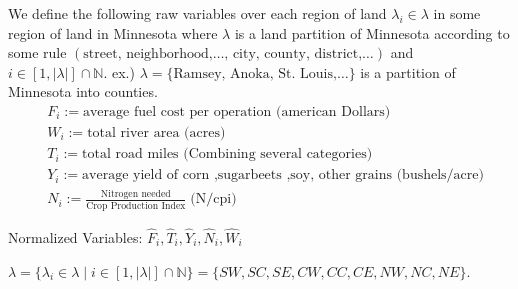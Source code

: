 \documentclass[addpoints,10pt]{exam}
\theoremstyle{plain}
\theoremstyle{definition}
\theoremstyle{plain}
\theoremstyle{plain}
\theoremstyle{definition}
\newcommand{\NN}{\ensuremath{\mathbb{N}}}
\begin{document}
We define the following raw variables over each region of land $\lambda_{i}\in \lambda$ in some region of land in Minnesota where $\lambda$ is a land partition of Minnesota according to some rule $(\text{street, neighborhood,}\hdots\text{, city, county, district,}\hdots)$ and $i\in [1,|\lambda|]\cap \NN$. ex.) $\lambda = \{\text{Ramsey, Anoka, St. Louis,}\hdots\}$ is a partition of Minnesota into counties. 
\begin{align*}
&F_{i}:= \text{average fuel cost per operation (american Dollars)}\\& W_{i}:= \text{total river area (acres)}\\ &T_{i}:= \text{total road miles (Combining several categories)}\\ &Y_{i}:= \text{average yield of corn ,sugarbeets ,soy, other grains (bushels/acre)}\\ &N_{i}:= \frac{\text{Nitrogen needed}}{\text{Crop Production Index}}\;\text{(N/cpi)}
\end{align*}

Normalized Variables: $\hat{F}_{i}, \hat{T}_{i}, \hat{Y}_{i}, \hat{N}_{i}, \hat{W}_{i}$


\begin{figure}[ht]
  \centering
{}
\end{figure}

$\lambda=\{\lambda_{i}\in \lambda\mid i\in [1,|\lambda|]\cap \NN\}=\{SW,SC,SE,CW,CC,CE,NW,NC,NE\}$.
\end{document}
